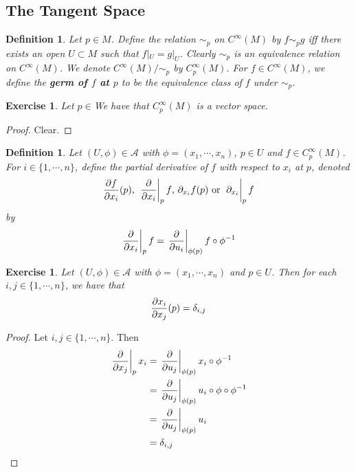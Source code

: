 \documentclass[12pt]{amsart}
\newtheorem{defn}[thm]{Definition}
\newtheorem{ex}[thm]{Exercise}
\newcommand{\del}{\delta}
\newcommand{\MA}{\mathcal{A}}
\begin{document}
	\newpage
	\subsection{The Tangent Space}

	\begin{defn}
		Let $p \in M$. Define the relation $\sim_p$ on $C^{\infty}(M)$ by $f \sim_p g$ iff there exists an open $U \subset M$ such that $f|_U = g|_U$. Clearly $\sim_p$ is an equivalence relation on $C^{\infty}(M)$. We denote $C^{\infty}(M) / \sim_p$ by $C^{\infty}_p(M)$. For $f \in C^{\infty}(M)$, we define the \textbf{germ of $f$ at $p$} to be the equivalence class of $f$ under $\sim_p$. 
	\end{defn}
	
	\begin{ex}
		Let $p \in $We have that $C_p^{\infty}(M)$ is a vector space.
	\end{ex}
	
	\begin{proof}
		Clear.
	\end{proof}

	\begin{defn}
		Let $(U, \phi) \in \MA$ with $\phi = (x_1, \cdots, x_n)$, $p \in U$ and $f \in C_p^{\infty}(M)$. For $i \in \{1, \cdots, n\}$, define the partial derivative of $f$ with respect to $x_i$ at $p$, denoted $$\frac{\partial f}{\partial x_i} (p) \text{, } \eval{\pdv{x_i}}_{p} f \text{, } \partial_{x_i} f (p) \text{ or } \eval{\partial_{x_i}}_{p} f$$ by $$ \eval{\pdv{x_i}}_{p} f =  \eval{\pdv{u_i}}_{\phi(p)} f \circ \phi^{-1} $$
	\end{defn}

	\begin{ex}
		Let $(U, \phi) \in \MA$ with $\phi = (x_1, \cdots, x_n)$ and $p \in U$. Then for each $i,j \in \{1, \cdots, n\}$, we have that $${\pdv{x_i}{x_j}}(p) = \del_{i,j}$$
	\end{ex}

	\begin{proof}
		Let $i,j \in \{1, \cdots, n\}$. Then 
		\begin{align*}
			\eval{\pdv{x_j}}_{p} x_i 
			&=  \eval{\pdv{u_j}}_{\phi(p)} x_i \circ \phi^{-1} \\
			&= \eval{\pdv{u_j}}_{\phi(p)} u_i \circ \phi \circ \phi^{-1} \\
			&= \eval{\pdv{u_j}}_{\phi(p)} u_i  \\
			&= \del_{i,j}
		\end{align*}
	\end{proof}
\end{document}
